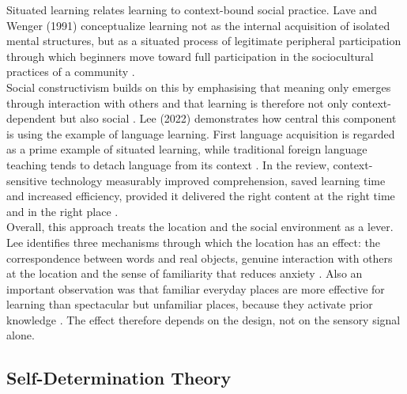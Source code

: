 \documentclass[runningheads]{llncs}
\begin{document}
Situated learning relates learning to context-bound social practice. Lave and Wenger (1991) conceptualize learning not as the internal acquisition of isolated mental structures, but as a situated process of legitimate peripheral participation through which beginners move toward full participation in the sociocultural practices of a community \cite{Lave_Wenger_1991}.\\
Social constructivism builds on this by emphasising that meaning only emerges through interaction with others and that learning is therefore not only context-dependent but also social \cite{abu-rasheed_context_2023}. Lee (2022) demonstrates how central this component is using the example of language learning. First language acquisition is regarded as a prime example of situated learning, while traditional foreign language teaching tends to detach language from its context \cite{lee_systematic_2022}. In the review, context-sensitive technology measurably improved comprehension, saved learning time and increased efficiency, provided it delivered the right content at the right time and in the right place \cite{lee_systematic_2022}. \\
Overall, this approach treats the location and the social environment as a lever. Lee identifies three mechanisms through which the location has an effect: the correspondence between words and real objects, genuine interaction with others at the location and the sense of familiarity that reduces anxiety \cite{lee_systematic_2022}. Also an important observation was that familiar everyday places are more effective for learning than spectacular but unfamiliar places, because they activate prior knowledge \cite{lee_systematic_2022}. The effect therefore depends on the design, not on the sensory signal alone.

\subsection{Self-Determination Theory}
\end{document}
